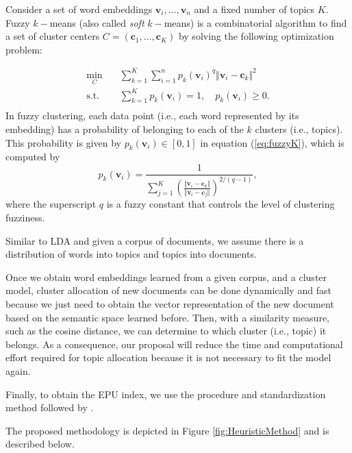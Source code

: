 \documentclass{article}
\begin{document}
Consider a set of word embeddings $\mathbf{v}_i,\ldots,\mathbf{v}_n$ and a fixed number of topics $K$. Fuzzy $k-$means (also called \emph{soft} $k-$means) is a combinatorial algorithm to find a set of cluster centers $C=(\mathbf{c}_1,\ldots,\mathbf{c}_K)$ by solving the following optimization problem:

\begin{equation}
    \label{eq:fuzzyK}
    \begin{aligned}
        \displaystyle \min_{C} \quad & \sum_{k=1}^K\sum_{i=1}^n p_k(\mathbf{v}_i)^q\Vert \mathbf{v}_i-\mathbf{c}_k \Vert^2 \\
        \textrm{s.t.} \quad & \sum_{k=1}^K p_k(\mathbf{v}_i) =1, \quad p_k(\mathbf{v}_i)\geq 0.\\
    \end{aligned}
\end{equation}
In fuzzy clustering, each data point (i.e., each word represented by its embedding) has a probability of belonging to each of the $k$ clusters (i.e., topics). This probability is given by $p_k(\mathbf{v}_i)\in[0,1]$ in equation (\ref{eq:fuzzyK}), which is computed by
\begin{equation}
    \label{eq:fuzzyK-p}
    p_k(\mathbf{v}_i) =  \frac{1}{\displaystyle \sum_{j=1}^K 
    \left(\frac{\Vert \mathbf{v}_i-\mathbf{c}_k \Vert}
    {\Vert \mathbf{v}_i-\mathbf{c}_j \Vert}\right)^{2/(q-1)}},
\end{equation}
where the superscript $q$ is a fuzzy constant that controls the level of clustering fuzziness.

Similar to LDA and given a corpus of documents, we assume there is a distribution of words into topics and topics into documents. 

Once we obtain word embeddings learned from a given corpus, and a cluster model, cluster allocation of new documents can be done dynamically and fast because we just need to obtain the vector representation of the new document based on the semantic space learned before. Then, with a similarity measure, such as the cosine distance, we can determine to which cluster (i.e., topic) it belongs. As a consequence, our proposal will reduce the time and computational effort required for topic allocation because it is not necessary to fit the model again. 

Finally, to obtain the EPU index, we use the procedure and standardization method followed by \cite{Baker2016}. 

The proposed methodology is depicted in Figure \ref{fig:HeuristicMethod} and is described below.
\end{document}
